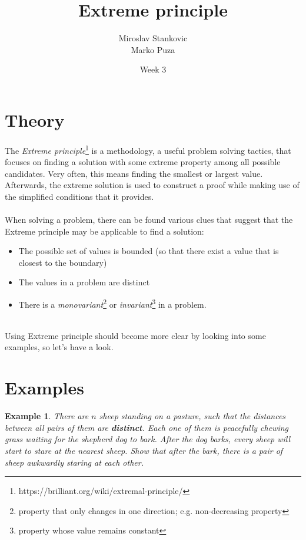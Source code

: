 \documentclass[12pt]{article}
\title{\textbf{Extreme principle}}
\date{Week 3}
\author{Miroslav Stankovic\\ Marko Puza}
\newtheorem{theorem}{Example}
\begin{document}
\maketitle

\section{Theory}

The \emph{Extreme principle}\footnote{https://brilliant.org/wiki/extremal-principle/} is a methodology, a useful problem solving tactics, that focuses on finding a solution with some extreme property among all possible candidates. Very often, this means finding the smallest or largest value. Afterwards, the extreme solution is used to construct a proof while making use of the simplified conditions that it provides.
\\\\
When solving a problem, there can be found various clues that suggest that the Extreme principle may be applicable to find a solution:
\begin{itemize}
	\item{The possible set of values is bounded (so that there exist 	a value that is closest to the boundary)}
	\item{The values in a problem are distinct}
	\item{There is a \emph{monovariant}\footnote{property that only changes in one direction; e.g. non-decreasing property} or \emph{invariant}\footnote{property whose value remains constant} in a problem.}
\end{itemize}


\noindent \\ Using Extreme principle should become more clear by looking into some examples, so let's have a look.

\section{Examples}

\begin{theorem}
There are $n$ sheep standing on a pasture, such that the distances between all pairs of them are \textbf{distinct}. Each one of them is peacefully chewing grass waiting for the shepherd dog to bark. After the dog barks, every sheep will start to stare at the nearest sheep. Show that after the bark, there is a pair of sheep awkwardly staring at each other.
\end{theorem}
\end{document}
